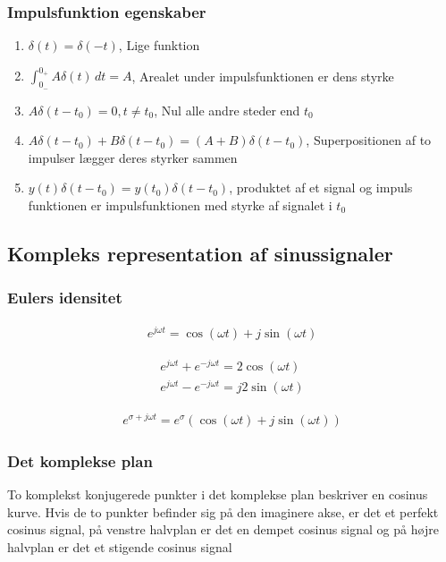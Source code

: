 	\subsubsection{Impulsfunktion egenskaber}
		\begin{enumerate}
			\item $\delta(t)=\delta(-t)$, Lige funktion
			\item $\int_{0_-}^{0_+}A\delta(t)\,dt=A$, Arealet under impulsfunktionen er dens styrke
			\item $A\delta(t-t_0)=0,t\neq t_0$, Nul alle andre steder end $t_0$
			\item $A\delta(t-t_0)+B\delta(t-t_0)=(A+B)\delta(t-t_0)$, Superpositionen af to impulser lægger deres styrker sammen
			\item $y(t)\delta(t-t_0)=y(t_0)\delta(t-t_0)$, produktet af et signal og impuls funktionen er impulsfunktionen med styrke af signalet i $t_0$
		\end{enumerate}

\subsection{Kompleks representation af sinussignaler}
	\subsubsection{Eulers idensitet}
		\begin{align}
			e^{j\omega t}=\cos(\omega t)+j\sin(\omega t)
		\end{align}

		\begin{align}
			e^{j\omega t}+e^{-j\omega t}=2\cos(\omega t)\\
			e^{j\omega t}-e^{-j\omega t}=j2\sin(\omega t)
		\end{align}

		\begin{align}
			e^{\sigma+j\omega t}=e^{\sigma}(\cos(\omega t)+j\sin(\omega t))
		\end{align}

	\subsubsection{Det komplekse plan}
		To komplekst konjugerede punkter i det komplekse plan beskriver en cosinus kurve. Hvis de to punkter befinder sig på den imaginere akse, er det et perfekt cosinus signal, på venstre halvplan er det en dempet cosinus signal og på højre halvplan er det et stigende cosinus signal

